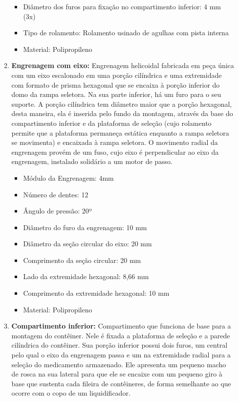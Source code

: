 \begin{enumerate}
\begin{enumerate}
\begin{itemize}
        \item Diâmetro dos furos para fixação no compartimento inferior: 4 mm (3x)
        \item Tipo de rolamento: Rolamento usinado de agulhas com pista interna
        \item Material: Polipropileno
    \end{itemize}
    \item \textbf{Engrenagem com eixo:} Engrenagem helicoidal fabricada em peça única com um eixo escalonado em uma porção cilíndrica e uma extremidade com formato de prisma hexagonal que se encaixa à porção inferior do domo da rampa seletora. Na sua parte inferior, há um furo para o seu suporte.
    A porção cilíndrica tem diâmetro maior que a porção hexagonal, desta maneira, ela é inserida pelo fundo da montagem, através da base do compartimento inferior e da plataforma de seleção (cujo rolamento permite que a plataforma permaneça estática enquanto a rampa seletora se movimenta) e encaixada à rampa seletora. O movimento radial da engrenagem provém de um fuso, cujo eixo é perpendicular ao eixo da engrenagem, instalado solidário a um motor de passo.
    \begin{itemize}
        \item Módulo da Engrenagem: 4mm
        \item Número de dentes: 12
        \item Ângulo de pressão: 20º
        \item Diâmetro do furo da engrenagem: 10 mm
        \item Diâmetro da seção circular do eixo: 20 mm
        \item Comprimento da seção circular: 20 mm
        \item Lado da extremidade hexagonal: 8,66 mm
        \item Comprimento da extremidade hexagonal: 10 mm
        \item Material: Polipropileno
    \end{itemize}
    \item \textbf{Compartimento inferior:} Compartimento que funciona de base para a montagem do contêiner. Nele é fixada a plataforma de seleção e a parede cilíndrica do contêiner. Sua porção inferior possui dois furos, um central pelo qual o eixo da engrenagem passa e um na extremidade radial para a seleção do medicamento armazenado. Ele apresenta um pequeno macho de rosca na sua lateral para que ele se encaixe com um pequeno giro à base que sustenta cada fileira de contêineres, de forma semelhante ao que ocorre com o copo de um liquidificador.

\end{enumerate}
\end{enumerate}
